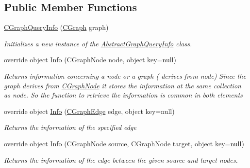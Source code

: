 \subsection*{Public Member Functions}
\begin{DoxyCompactItemize}
\item 
\hyperlink{class_graph_library_1_1_c_graph_query_info_a3b4904ea0d850f99d13969b2b060f39b}{C\+Graph\+Query\+Info} (\hyperlink{class_graph_library_1_1_c_graph}{C\+Graph} graph)
\begin{DoxyCompactList}\small\item\em Initializes a new instance of the \hyperlink{class_graph_library_1_1_generics_1_1_abstract_graph_query_info_a8dd567e7f04df4a55df4bd8b4a0c3e48}{Abstract\+Graph\+Query\+Info} class. \end{DoxyCompactList}\item 
override object \hyperlink{class_graph_library_1_1_c_graph_query_info_affa34cf122ba03f978f4a276f32ccfb5}{Info} (\hyperlink{class_graph_library_1_1_c_graph_node}{C\+Graph\+Node} node, object key=null)
\begin{DoxyCompactList}\small\item\em Returns information concerning a node or a graph ( derives from node) Since the graph derives from \hyperlink{class_graph_library_1_1_c_graph_node}{C\+Graph\+Node} it stores the information at the same collection as node. So the function to retrieve the information is common in both elements \end{DoxyCompactList}\item 
override object \hyperlink{class_graph_library_1_1_c_graph_query_info_a0cc7688e9e571af4587c232a51b73acd}{Info} (\hyperlink{class_graph_library_1_1_c_graph_edge}{C\+Graph\+Edge} edge, object key=null)
\begin{DoxyCompactList}\small\item\em Returns the information of the specified edge \end{DoxyCompactList}\item 
override object \hyperlink{class_graph_library_1_1_c_graph_query_info_a1f12d92a287f9f5779416649705f36e4}{Info} (\hyperlink{class_graph_library_1_1_c_graph_node}{C\+Graph\+Node} source, \hyperlink{class_graph_library_1_1_c_graph_node}{C\+Graph\+Node} target, object key=null)
\begin{DoxyCompactList}\small\item\em Returns the information of the edge between the given source and target nodes. \end{DoxyCompactList}\item 

\end{DoxyCompactItemize}
